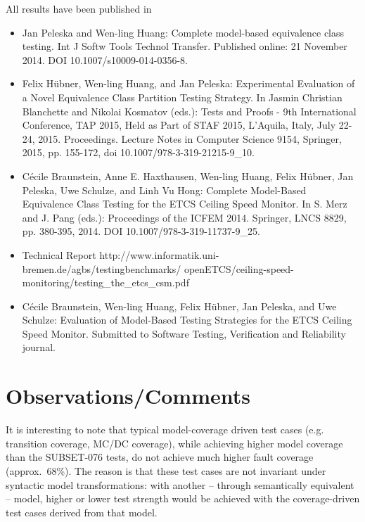 All   results have been published in 
\begin{itemize}
\item  Jan Peleska and Wen-ling Huang: Complete model-based equivalence class testing. Int J Softw Tools Technol Transfer. Published online: 21 November 2014. DOI 10.1007/s10009-014-0356-8.

\item Felix Hübner, Wen-ling Huang, and Jan Peleska: Experimental Evaluation of a Novel Equivalence Class Partition Testing Strategy. In Jasmin Christian Blanchette and Nikolai Kosmatov (eds.): Tests and Proofs - 9th International Conference, TAP 2015, Held as Part of STAF 2015, L'Aquila, Italy, July 22-24, 2015. Proceedings. Lecture Notes in Computer Science 9154, Springer, 2015, pp. 155-172, doi 10.1007/978-3-319-21215-9\_10.

\item C{\'e}cile Braunstein, Anne E. Haxthausen, Wen-ling Huang, Felix Hübner, Jan Peleska, Uwe Schulze, and Linh Vu Hong: Complete Model-Based Equivalence Class Testing for the ETCS Ceiling Speed Monitor. In S. Merz and J. Pang (eds.): Proceedings of the ICFEM 2014. Springer, LNCS 8829, pp. 380-395, 2014. DOI 10.1007/978-3-319-11737-9\_25.


\item Technical Report http://www.informatik.uni-bremen.de/agbs/testingbenchmarks/
\newline
openETCS/ceiling-speed-monitoring/testing\_the\_etcs\_csm.pdf





\item C{\'e}cile Braunstein,   Wen-ling Huang, Felix Hübner, Jan Peleska, and Uwe Schulze: Evaluation of Model-Based Testing Strategies for the ETCS Ceiling Speed Monitor.
Submitted to Software Testing, Verification and Reliability journal.

\end{itemize}






\section{Observations/Comments}

It is interesting to note that typical model-coverage driven test cases (e.g. transition coverage, MC/DC coverage), while achieving higher model coverage than the
SUBSET-076 tests, do not achieve much higher fault coverage (approx.~68\%). 
The reason is that   these test cases are not invariant under syntactic model transformations: with another -- through semantically equivalent -- model, higher or lower test strength would be achieved with the coverage-driven test cases derived
from that model. 

